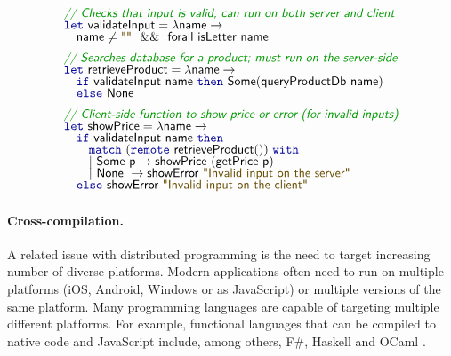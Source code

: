 \begin{figure}
\begin{equation*}
\begin{array}{l}
\cmt{// Checks that input is valid; can run on both server and client}\\[-0.25em]
\kvd{let}~\ident{validateInput} = \lambda \ident{name} \rightarrow\\[-0.25em]
\quad\ident{name} \neq \str{} ~~\&\&~~ \ident{forall~isLetter~name}
\\[0.5em]
\cmt{// Searches database for a product; must run on the server-side}\\[-0.25em]
\kvd{let}~\ident{retrieveProduct} = \lambda \ident{name} \rightarrow\\[-0.25em]
\quad\kvd{if}~\ident{validateInput name}~\kvd{then}~\ident{Some}(\ident{queryProductDb~name})\\[-0.25em]
\quad\kvd{else}~\ident{None}
\\[0.5em]
\cmt{// Client-side function to show price or error (for invalid inputs)}\\[-0.25em]
\kvd{let}~\ident{showPrice} = \lambda \ident{name} \rightarrow\\[-0.25em]
\quad\kvd{if}~\ident{validateInput name}~\kvd{then}\\[-0.25em]
\quad\quad\kvd{match}~(\kvd{remote}~\ident{retrieveProduct}())~\kvd{with}\\[-0.25em]
\quad\quad|~\ident{Some}~\ident{p} \rightarrow \ident{showPrice}~(\ident{getPrice}~\ident{p})\\[-0.25em]
\quad\quad|~\ident{None}~\rightarrow \ident{showError}~\str{Invalid input on the server}\\[-0.25em]
\quad\kvd{else}~\ident{showError}~\str{Invalid input on the client}
\end{array}
\end{equation*}

\label{fig:applications-flat-distr}
\end{figure}


\paragraph{Cross-compilation.}
A related issue with distributed programming is the need to target increasing number of diverse
platforms. Modern applications often need to run on multiple platforms (iOS, Android, Windows or
as JavaScript) or multiple versions of the same platform. Many programming languages are capable
of targeting multiple different platforms. For example, functional languages that can be compiled
to native code and JavaScript include, among others, F\#, Haskell and OCaml \cite{app-ocaml-js}.

